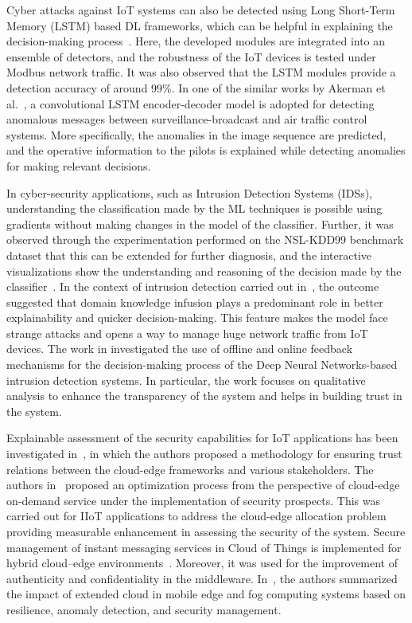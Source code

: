 \documentclass[journal]{IEEEtran}
\begin{document}
Cyber attacks against IoT systems can also be detected using Long Short-Term Memory (LSTM) based DL frameworks, which can be helpful in explaining the decision-making process~\cite{saharkhizan2020ensemble}. Here, the developed modules are integrated into an ensemble of detectors, and the robustness of the IoT devices is tested under Modbus network traffic. It was also observed that the LSTM modules provide a detection accuracy of around 99\%. In one of the similar works by Akerman et al.~\cite{akerman2019vizads}, a convolutional LSTM encoder-decoder model is adopted for detecting anomalous messages between surveillance-broadcast and air traffic control systems. More specifically, the anomalies in the image sequence are predicted, and the operative information to the pilots is explained while detecting anomalies for making relevant decisions.   

In cyber-security applications, such as Intrusion Detection Systems (IDSs), understanding the classification made by the ML techniques is possible using gradients without making changes in the model of the classifier. Further, it was observed through the experimentation performed on the NSL-KDD99 benchmark dataset that this can be extended for further diagnosis, and the interactive visualizations show the understanding and reasoning of the decision made by the classifier~\cite{marino2018adversarial}. In the context of intrusion detection carried out in~\cite{islam2019domain}, the outcome suggested that domain knowledge infusion plays a predominant role in better explainability and quicker decision-making. This feature makes the model face strange attacks and opens a way to manage huge network traffic from IoT devices. The work in \cite{amarasinghe2018improving} investigated the use of offline and online feedback mechanisms for the decision-making process of the Deep Neural Networks-based intrusion detection systems. In particular, the work focuses on qualitative analysis to enhance the transparency of the system and helps in building trust in the system.

Explainable assessment of the security capabilities for IoT applications has been investigated in~\cite{forti2020secure}, in which the authors proposed a methodology for ensuring trust relations between the cloud-edge frameworks and various stakeholders. The authors in~\cite{casola2020security} proposed an optimization process from the perspective of cloud-edge on-demand service under the implementation of security prospects. This was carried out for IIoT applications to address the cloud-edge allocation problem providing measurable enhancement in assessing the security of the system. Secure management of instant messaging services in Cloud of Things is implemented for hybrid cloud–edge environments~\cite{celesti2019approach}. Moreover, it was used for the improvement of authenticity and confidentiality in the middleware. In~\cite{shirazi2017extended}, the authors summarized the impact of extended cloud in mobile edge and fog computing systems based on resilience, anomaly detection, and security management. 
\end{document}
